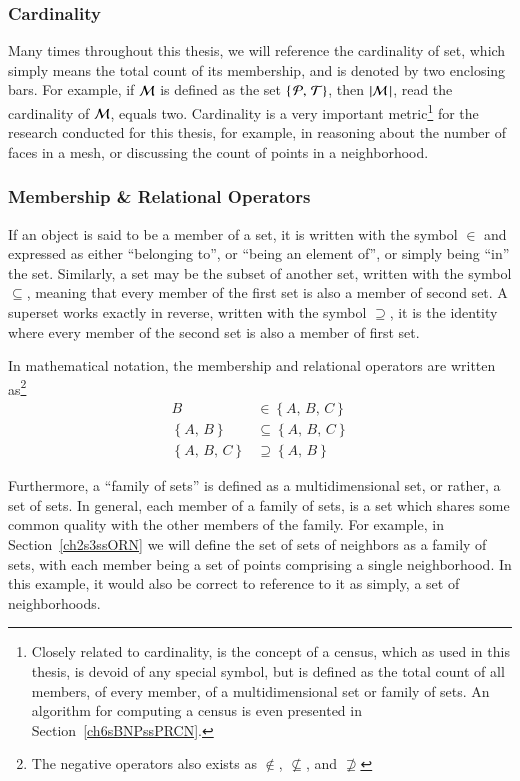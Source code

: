 %
%
\subsubsection{Cardinality}
\label{ch2sETBssSTsssC}
Many times throughout this thesis, we will reference the cardinality of set, which simply means the total count of its membership, and is denoted by two enclosing bars. For example, if $\mathcal{M}$ is defined as the set $\left \{\,\mathcal{P},\,\mathcal{T}\right \}$, then $|\mathcal{M}\,| $, read the cardinality of $\mathcal{M}$, equals two. Cardinality is a very important metric\footnote{Closely related to cardinality, is the concept of a census, which as used in this thesis, is devoid of any special symbol, but is defined as the total count of all members, of every member, of a multidimensional set or family of sets. An algorithm for computing a census is even presented in Section~\ref{ch6sBNPssPRCN}.} for the research conducted for this thesis, for example, in reasoning about the number of faces in a mesh, or discussing the count of points in a neighborhood.

%
%
\subsubsection{Membership \& Relational Operators}
\label{ch2sETBssSTsssMRO}
If an object is said to be a member of a set, it is written with the symbol $\in$ and expressed as either ``belonging to'', or ``being an element of'', or simply being ``in'' the set. Similarly, a set may be the subset of another set, written with the symbol $\subseteq$, meaning that every member of the first set is also a member of second set. A superset works exactly in reverse, written with the symbol $\supseteq$, it is the identity where every member of the second set is also a member of first set.

In mathematical notation, the membership and relational operators are written as\footnote{The negative operators also exists as $\notin$, $\nsubseteq$, and  $\nsupseteq$}
\begin{align}
	B & \in \left \{A,\,B,\,C\right \} \\
	\left \{A,\,B\right \} & \subseteq \left \{A,\,B,\,C\right \} \\
	\left \{A,\,B,\,C\right \} & \supseteq \left \{A,\,B\right \}
\end{align}

Furthermore, a ``family of sets'' is defined as a multidimensional set, or rather, a set of sets. In general, each member of a family of sets, is a set which shares some common quality with the other members of the family. For example, in Section~\ref{ch2s3ssORN} we will define the set of sets of neighbors as a family of sets, with each member being a set of points comprising a single neighborhood. In this example, it would also be correct to reference to it as simply, a set of neighborhoods.

